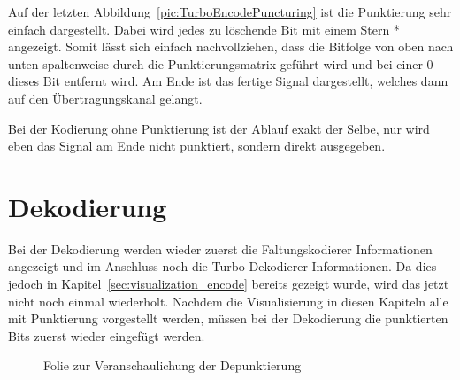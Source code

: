 Auf der letzten Abbildung~\ref{pic:TurboEncodePuncturing} ist die Punktierung sehr einfach dargestellt. Dabei wird jedes zu löschende Bit mit einem Stern * angezeigt. Somit lässt sich einfach nachvollziehen, dass die Bitfolge von oben nach unten spaltenweise durch die Punktierungsmatrix geführt wird und bei einer 0 dieses Bit entfernt wird. Am Ende ist das fertige Signal dargestellt, welches dann auf den Übertragungskanal gelangt. 

Bei der Kodierung ohne Punktierung ist der Ablauf exakt der Selbe, nur wird eben das Signal am Ende nicht punktiert, sondern direkt ausgegeben.

\FloatBarrier
\section{Dekodierung}
\label{sec:visualization_decode}
Bei der Dekodierung werden wieder zuerst die Faltungskodierer Informationen angezeigt und im Anschluss noch die Turbo-Dekodierer Informationen. Da dies jedoch in Kapitel~\ref{sec:visualization_encode} bereits gezeigt wurde, wird das jetzt nicht noch einmal wiederholt. Nachdem die Visualisierung in diesen Kapiteln alle mit Punktierung vorgestellt werden, müssen bei der Dekodierung die punktierten Bits zuerst wieder eingefügt werden.

\begin{figure}[th]
\centering
{}
\caption{Folie zur Veranschaulichung der Depunktierung}
\label{pic:TurboDecodeDepuncturing}
\end{figure}

